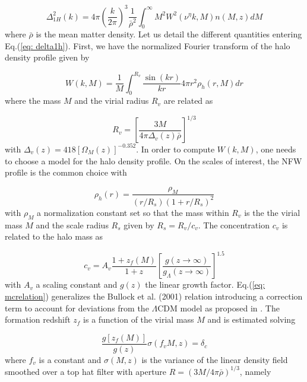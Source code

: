 \begin{equation}
\Delta_{1H}^2(k) = 4 \pi \left ( \frac{k}{2 \pi} \right )^{3} \frac{1}{\bar{\rho}^2} \int_{0}^{\infty}{M^2 W^2(\nu^\eta k, M) n(M, z) dM} 
\label{eq: delta1h}
\end{equation}
where $\bar{\rho}$ is the mean matter density. Let us detail the different quantities entering Eq.(\ref{eq: delta1h}). First, we have the normalized Fourier transform of the halo density profile given by

\begin{equation}
W(k, M) = \frac{1}{M} \int_{0}^{R_v}{\frac{\sin{(kr)}}{kr} 4 \pi r^2 \rho_{h}(r, M) dr}
\label{eq: fthalo}
\end{equation}
where the mass $M$ and the virial radius $R_v$ are related as

\begin{equation}
R_v = \left [ \frac{3M}{4 \pi \Delta_v(z) \bar{\rho}} \right ]^{1/3}
\label{eq: rvm}
\end{equation}
with $\Delta_v(z) = 418 [\Omega_M(z)]^{-0.352}$. In order to compute $W(k, M)$, one needs to choose a model for the halo density profile. On the scales of interest, the NFW profile \cite{NFW96,NFW97} is the common choice with 

\begin{equation}
\rho_h(r) = \frac{\rho_M}{(r/R_s) ( 1+ r/R_s)^2}
\label{eq: nfw}
\end{equation}
with $\rho_M$ a normalization constant set so that the mass within $R_v$ is the the virial mass $M$ and the scale radius $R_s$ given by $R_s = R_v/c_v$. The concentration $c_v$ is related to the halo mass as

\begin{equation}
c_v = A_v \frac{1 + z_f(M)}{1 + z}  \left [ \frac{g(z \rightarrow \infty)}{g_{\Lambda}(z \rightarrow \infty)} \right ]^{1.5}
\label{eq: mcrelation}
\end{equation}
with $A_v$ a scaling constant and $g(z)$ the linear growth factor. Eq.(\ref{eq: mcrelation}) generalizes the Bullock et al. (2001) relation introducing a correction term to account for deviations from the $\Lambda$CDM model as proposed in \cite{Dol04}. The formation redshift $z_f$ is a function of the virial mass $M$ and is estimated solving

\begin{equation}
\frac{g[z_f(M)]}{g(z)} \sigma(f_v M, z) = \delta_c
\label{eq: zfsolve}
\end{equation}
where $f_v$ is a constant and $\sigma(M, z)$ is the variance of the linear density field smoothed over a top hat filter with aperture $R = (3M/4\pi \bar{\rho})^{1/3}$, namely

